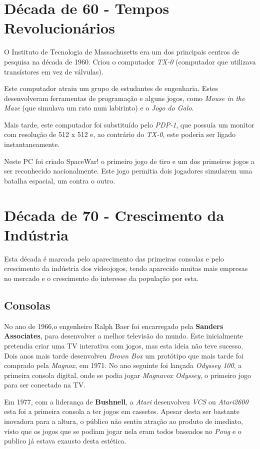 \documentclass{report}
\begin{document}
\section{Década de 60 - Tempos Revolucionários}
\label{sec.Década de 60 - Tempos Revolucionários}
O Instituto de Tecnologia de Massachusetts era um dos principais centros de pesquisa na década de 1960. Criou o computador \textit{TX-0} (computador que utilizava transístores em vez de válvulas).

Este computador atraiu um grupo de estudantes de engenharia. Estes desenvolveram ferramentas de programação e alguns jogos, como \textit{Mouse in the Maze} (que simulava um rato num labirinto) e o \textit{Jogo do Galo}.

Mais tarde, este computador foi substituído pelo \textit{PDP-1}, que possuía um monitor com resolução de 512 x 512 e, ao contrário do \textit{TX-0}, este poderia ser ligado instantaneamente.

Neste PC foi criado SpaceWar! o primeiro jogo de tiro e um dos primeiros jogos a ser reconhecido nacionalmente. Este jogo permitia dois jogadores simularem uma batalha espacial, um contra o outro.


\section{Década de 70 - Crescimento da Indústria}
\label{sec.Década de 70 - Crescimento da Indústria}
Esta década é marcada pelo aparecimento das primeiras consolas e pelo crescimento da indústria dos videojogos, tendo aparecido muitas mais empresas no mercado e o crescimento do interesse da população por esta.

\subsection{Consolas}
\label{subsec.Consolas}
No ano de 1966,o engenheiro Ralph Baer foi encarregado pela \textbf{Sanders Associates}, para desenvolver a melhor televisão do mundo. Este inicialmente pretendia criar uma TV interativa com jogos, mas esta ideia não teve sucesso. Dois anos mais tarde desenvolveu \textit{Brown Box} um protótipo que mais tarde foi comprado pela \textit{Magnox}, em 1971. No ano seguinte foi lançada \textit{Odyssey 100}, a primeira consola digital, onde se podia jogar \textit{Magnavox Odyssey}, o primeiro jogo para ser conectado na TV.

Em 1977, com a liderança de \textbf{Bushnell}, a \textit{Atari} desenvolveu  \textit{VCS} ou \textit{Atari2600} esta foi a primeira consola a ter jogos em cassetes. Apesar desta ser bastante inovadora para a altura, o público não sentiu atração ao produto de imediato, visto que os jogos que se podiam jogar nela eram todos baseados no \textit{Pong} e o publico já estava exausto desta estética.
\end{document}
